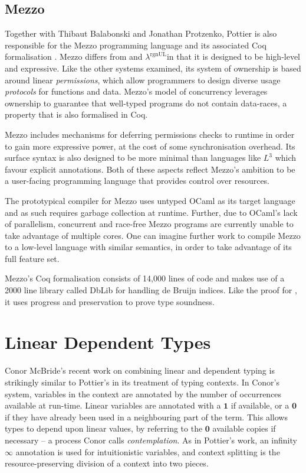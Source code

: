 \documentclass[]{unswthesis}
\newcommand{\rgnUL}{$\lambda^\text{rgnUL}$\text{ }}
\newcommand{\SSPHS}{\text{SSPHS }}
\let\i\textit
\let\b\textbf
\begin{document}
\subsection{Mezzo}

Together with Thibaut Balabonski and Jonathan Protzenko, Pottier is also responsible for the Mezzo programming language and its associated Coq formalisation \cite{mezzo14}. Mezzo differs from \SSPHS and \rgnUL in that it is designed to be high-level and expressive. Like the other systems examined, its system of ownership is based around linear \i{permissions}, which allow programmers to design diverse usage \i{protocols} for functions and data. Mezzo's model of concurrency leverages ownership to guarantee that well-typed programs do not contain data-races, a property that is also formalised in Coq.

Mezzo includes mechanisms for deferring permissions checks to runtime in order to gain more expressive power, at the cost of some synchronisation overhead. Its surface syntax is also designed to be more minimal than languages like $L^3$ which favour explicit annotations. Both of these aspects reflect Mezzo's ambition to be a user-facing programming language that provides control over resources.

The prototypical compiler for Mezzo uses untyped OCaml as its target language and as such requires garbage collection at runtime. Further, due to OCaml's lack of parallelism, concurrent and race-free Mezzo programs are currently unable to take advantage of multiple cores. One can imagine further work to compile Mezzo to a low-level language with similar semantics, in order to take advantage of its full feature set.

Mezzo's Coq formalisation consists of 14,000 lines of code and makes use of a 2000 line library called DbLib for handling de Bruijn indices. Like the proof for \SSPHS, it uses progress and preservation to prove type soundness.

\section{Linear Dependent Types}
\label{sec:linear-dep}

Conor McBride's recent work on combining linear and dependent typing \cite{mcbride16} is strikingly similar to Pottier's \SSPHS in its treatment of typing contexts. In Conor's system, variables in the context are annotated by the number of occurrences available at run-time. Linear variables are annotated with a $\b{1}$ if available, or a $\b{0}$ if they have already been used in a neighbouring part of the term. This allows types to depend upon linear values, by referring to the $\b{0}$ available copies if necessary -- a process Conor calls \i{contemplation}. As in Pottier's work, an infinity $\infty$ annotation is used for intuitionistic variables, and context splitting is the resource-preserving division of a context into two pieces.
\end{document}
